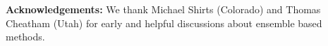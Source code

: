 \documentclass[10pt,letterpaper,draft]{article}
\begin{document}
{\noindent \bf Acknowledgements:} We thank Michael Shirts (Colorado) and Thomas Cheatham
(Utah) for early and helpful discussions about ensemble based methods.


\setcounter{page}{1} \pagestyle{plain} 


\end{document}
